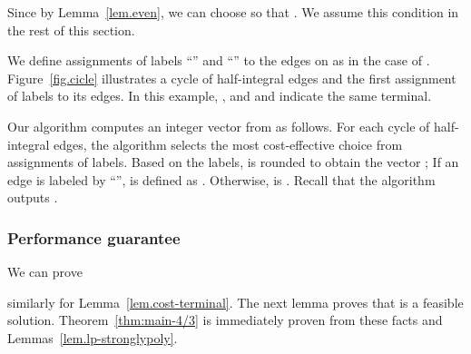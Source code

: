 \documentclass{article}
\begin{document}
Since  by Lemma~\ref{lem.even}, we can choose  so that
. We assume this condition in the rest of this section.

We define  assignments of labels ``'' and ``''
to the edges on  as in the case of .
 Figure~\ref{fig.cicle} illustrates 
 a cycle of half-integral edges and the first assignment of labels 
 to its edges. In this example, , and  and  indicate the same terminal.


Our algorithm computes an integer vector  from  as follows.
For each cycle  of half-integral edges,
the algorithm selects the most cost-effective choice from  assignments of labels.
Based on the labels,
 is rounded to obtain the vector ;
If an edge  is labeled by ``'',   is defined as .
Otherwise,  is .
Recall that the algorithm outputs .



\subsubsection*{Performance guarantee}

We can prove

similarly for Lemma~\ref{lem.cost-terminal}.
The next lemma proves that  is a feasible solution.
Theorem~\ref{thm:main-4/3} is immediately proven from
these facts and Lemmas~\ref{lem.lp-stronglypoly}.
\end{document}
